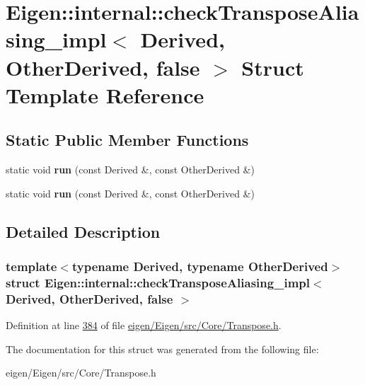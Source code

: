 \hypertarget{struct_eigen_1_1internal_1_1check_transpose_aliasing__impl_3_01_derived_00_01_other_derived_00_01false_01_4}{}\section{Eigen\+:\+:internal\+:\+:check\+Transpose\+Aliasing\+\_\+impl$<$ Derived, Other\+Derived, false $>$ Struct Template Reference}
\label{struct_eigen_1_1internal_1_1check_transpose_aliasing__impl_3_01_derived_00_01_other_derived_00_01false_01_4}
\subsection*{Static Public Member Functions}
\begin{DoxyCompactItemize}
\item 
\mbox{\label{struct_eigen_1_1internal_1_1check_transpose_aliasing__impl_3_01_derived_00_01_other_derived_00_01false_01_4_a9b124ec8236f4729eeb12d619da434df}} 
static void {\bfseries run} (const Derived \&, const Other\+Derived \&)
\item 
\mbox{\label{struct_eigen_1_1internal_1_1check_transpose_aliasing__impl_3_01_derived_00_01_other_derived_00_01false_01_4_a9b124ec8236f4729eeb12d619da434df}} 
static void {\bfseries run} (const Derived \&, const Other\+Derived \&)
\end{DoxyCompactItemize}


\subsection{Detailed Description}
\subsubsection*{template$<$typename Derived, typename Other\+Derived$>$\newline
struct Eigen\+::internal\+::check\+Transpose\+Aliasing\+\_\+impl$<$ Derived, Other\+Derived, false $>$}



Definition at line \hyperlink{eigen_2_eigen_2src_2_core_2_transpose_8h_source_l00384}{384} of file \hyperlink{eigen_2_eigen_2src_2_core_2_transpose_8h_source}{eigen/\+Eigen/src/\+Core/\+Transpose.\+h}.



The documentation for this struct was generated from the following file\+:\begin{DoxyCompactItemize}
\item 
eigen/\+Eigen/src/\+Core/\+Transpose.\+h\end{DoxyCompactItemize}
